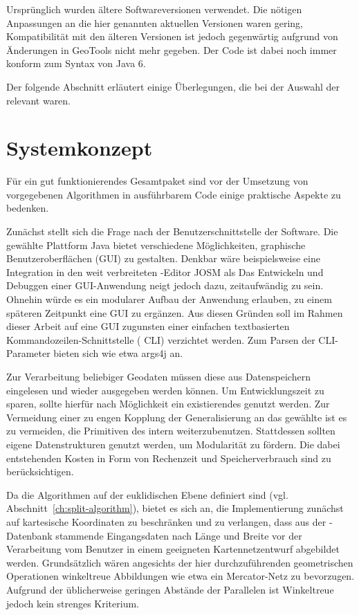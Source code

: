 \documentclass[../main/thesis.tex]{subfiles}
\begin{document}
Ursprünglich wurden ältere Softwareversionen verwendet.
Die nötigen Anpassungen an die hier genannten aktuellen Versionen waren gering, Kompatibilität mit den älteren Versionen ist jedoch gegenwärtig aufgrund von Änderungen in GeoTools nicht mehr gegeben.
Der Code ist dabei noch immer konform zum Syntax von Java 6. 

Der folgende Abschnitt erläutert einige Überlegungen, die bei der Auswahl der  relevant waren.



\section{Systemkonzept}

Für ein gut funktionierendes Gesamtpaket sind vor der Umsetzung von vorgegebenen Algorithmen in ausführbarem Code einige praktische Aspekte zu bedenken.

Zunächst stellt sich die Frage nach der Benutzerschnittstelle der Software.
Die gewählte Plattform Java bietet verschiedene Möglichkeiten, graphische Benutzeroberflächen (GUI) zu gestalten.
Denkbar wäre beispielsweise eine Integration in den weit verbreiteten \osm-Editor JOSM als 
Das Entwickeln und Debuggen einer GUI-Anwendung neigt jedoch dazu, zeitaufwändig zu sein.
Ohnehin würde es ein modularer Aufbau der Anwendung erlauben, zu einem späteren Zeitpunkt eine GUI zu ergänzen.
Aus diesen Gründen soll im Rahmen dieser Arbeit auf eine GUI zugunsten einer einfachen textbasierten Kommandozeilen-Schnittstelle ( CLI) verzichtet werden.
Zum Parsen der CLI-Parameter bieten sich  wie etwa args4j an.

Zur Verarbeitung beliebiger Geodaten müssen diese aus Datenspeichern eingelesen und wieder ausgegeben werden können.
Um Entwicklungszeit zu sparen, sollte hierfür nach Möglichkeit ein existierendes  genutzt werden.
Zur Vermeidung einer zu engen Kopplung der Generalisierung an das gewählte  ist es zu vermeiden, die Primitiven des  intern weiterzubenutzen.
Stattdessen sollten eigene Datenstrukturen genutzt werden, um Modularität zu fördern.
Die dabei entstehenden Kosten in Form von Rechenzeit und Speicherverbrauch sind zu berücksichtigen.

Da die Algorithmen auf der euklidischen Ebene definiert sind (vgl. Abschnitt~\ref{ch:split-algorithm}), bietet es sich an, die Implementierung zunächst auf kartesische Koordinaten zu beschränken und zu verlangen, dass aus der \osm-Datenbank stammende Eingangsdaten nach Länge und Breite vor der Verarbeitung vom Benutzer in einem geeigneten Kartennetzentwurf abgebildet werden.
Grundsätzlich wären angesichts der hier durchzuführenden geometrischen Operationen winkeltreue Abbildungen wie etwa ein Mercator-Netz zu bevorzugen.
Aufgrund der üblicherweise geringen Abstände der Parallelen ist Winkeltreue jedoch kein strenges Kriterium.
\end{document}
